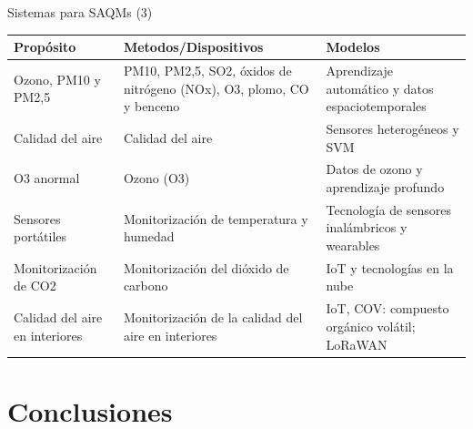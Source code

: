\documentclass[aspectratio=169,compress]{beamer}
\begin{document}
\begin{frame}{Sistemas para SAQMs (3)}
\begin{center}
\footnotesize
\begin{tabular}{p{4.5cm}|p{4.5cm}|p{4.5cm}}
\hline
\textbf{Propósito} & \textbf{Metodos/Dispositivos} & \textbf{Modelos} \\
\hline

Ozono, PM10 y PM2,5 &
PM10, PM2,5, SO2, óxidos de nitrógeno (NOx), O3, plomo, CO y benceno &
Aprendizaje automático y datos espaciotemporales  \\  \hline

Calidad del aire &
Calidad del aire  &
Sensores heterogéneos y SVM  \\  \hline

O3 anormal &
Ozono (O3) &
Datos de ozono y aprendizaje profundo  \\  \hline

Sensores portátiles &
Monitorización de temperatura y humedad &
Tecnología de sensores inalámbricos y wearables  \\  \hline

Monitorización de CO2 &
Monitorización del dióxido de carbono &
IoT y tecnologías en la nube  \\  \hline

Calidad del aire en interiores &
Monitorización de la calidad del aire en interiores &
IoT, COV: compuesto orgánico volátil; LoRaWAN  \\  \hline


\end{tabular}
\end{center}

\end{frame}



\section{Conclusiones}

\end{document}
